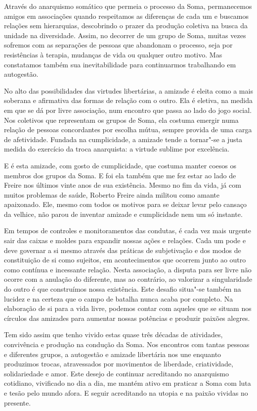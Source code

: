 Através do anarquismo somático que permeia o processo da Soma,
permanecemos amigos em associações quando respeitamos as diferenças de
cada um e buscamos relações sem hierarquias, descobrindo o prazer da
produção coletiva na busca da unidade na diversidade. Assim, no decorrer
de um grupo de Soma, muitas vezes sofremos com as separações de pessoas
que abandonam o processo, seja por resistências à terapia, mudanças de
vida ou qualquer outro motivo. Mas constatamos também sua
inevitabilidade para continuarmos trabalhando em autogestão.

No alto das possibilidades das virtudes libertárias, a amizade é eleita
como a mais soberana e afirmativa das formas de relação com o outro. Ela
é eletiva, na medida em que se dá por livre associação, num encontro que
passa ao lado do jogo social. Nos coletivos que representam os grupos de
Soma, ela costuma emergir numa relação de pessoas concordantes por
escolha mútua, sempre provida de uma carga de afetividade. Fundada na
cumplicidade, a amizade tende a tornar"-se a justa medida do exercício da
troca anarquista: a virtude sublime por excelência.

E é esta amizade, com gosto de cumplicidade, que costuma manter coesos
os membros dos grupos da Soma. E foi ela também que me fez estar ao lado
de Freire nos últimos vinte anos de sua existência. Mesmo no fim da
vida, já com muitos problemas de saúde, Roberto Freire ainda militou
como amante apaixonado. Ele, mesmo com todos os motivos para se deixar
levar pelo cansaço da velhice, não parou de inventar amizade e
cumplicidade nem um só instante.

Em tempos de controles e monitoramentos das condutas, é cada vez mais
urgente sair das caixas e moldes para expandir nossas ações e relações.
Cada um pode e deve governar a si mesmo através das práticas de
subjetivação e dos modos de constituição de si como sujeitos, em
acontecimentos que ocorrem junto ao outro como contínua e incessante
relação. Nesta associação, a disputa para ser livre não ocorre com a
anulação do diferente, mas ao contrário, ao valorizar a singularidade do
outro é que construímos nossa existência. Este desafio situa"-se também
na lucidez e na certeza que o campo de batalha nunca acaba por completo.
Na elaboração de si para a vida livre, podemos contar com aqueles que se
situam nos círculos das amizades para aumentar nossas potências e
produzir paixões alegres.

Tem sido assim que tenho vivido estas quase três décadas de atividades,
convivência e produção na condução da Soma. Nos encontros com tantas
pessoas e diferentes grupos, a autogestão e amizade libertária nos une
enquanto produzimos trocas, atravessados por movimentos de liberdade,
criatividade, solidariedade e amor. Este desejo de continuar acreditando
no anarquismo cotidiano, vivificado no dia a dia, me mantém ativo em
praticar a Soma com luta e tesão pelo mundo afora. E seguir acreditando
na utopia e na paixão vividas no presente.

